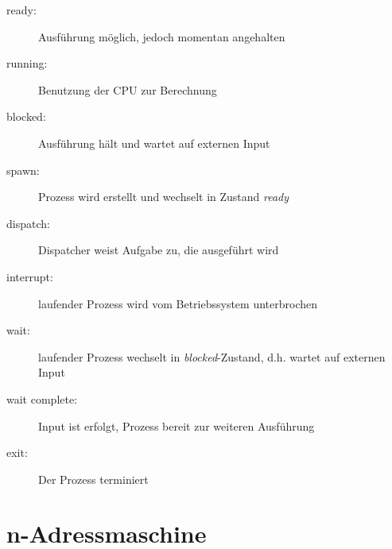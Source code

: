 \documentclass[a4paper,11pt]{scrartcl}
\begin{document}
\begin{enumerate}[\bf a)]
        \begin{description}
            \item[ready:] Ausführung möglich, jedoch momentan angehalten
            \item[running:] Benutzung der CPU zur Berechnung
            \item[blocked:] Ausführung hält und wartet auf externen Input
            \item[spawn:] Prozess wird erstellt und wechselt in Zustand \textit{ready}
            \item[dispatch:] Dispatcher weist Aufgabe zu, die ausgeführt wird
            \item[interrupt:] laufender Prozess wird vom Betriebssystem unterbrochen
            \item[wait:] laufender Prozess wechselt in \textit{blocked}-Zustand, d.h. wartet auf externen Input
            \item[wait complete:] Input ist erfolgt, Prozess bereit zur weiteren Ausführung
            \item[exit:] Der Prozess terminiert
        \end{description}
\end{enumerate}

\section{n-Adressmaschine}
\end{document}
